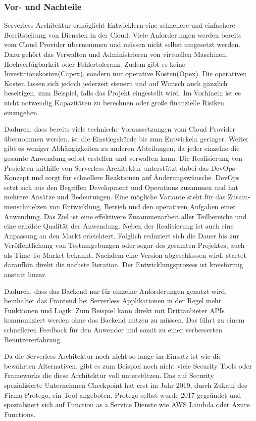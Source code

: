 \subsubsection{Vor- und Nachteile}
Serverless Architektur ermöglicht Entwicklern eine schnellere und einfachere Bereitstellung von Diensten in der Cloud.
Viele Anforderungen werden bereits vom Cloud Provider übernommen und müssen nicht selbst umgesetzt werden.
Dazu gehört das Verwalten und Administrieren von virtuellen Maschinen, Hochverfügbarkeit oder Fehlertoleranz.
Zudem gibt es keine Investitionskosten(Capex), sondern nur operative Kosten(Opex).
Die operativen Kosten lassen sich jedoch jederzeit steuern und auf Wunsch auch gänzlich beseitigen, zum Beispiel, falls das Projekt eingestellt wird.
Im Vorhinein ist es nicht notwendig Kapazitäten zu berechnen oder große finanzielle Risiken einzugehen.

Dadurch, dass bereits viele technische Voraussetzungen vom Cloud Provider übernommen werden, ist die Einstiegshürde bis zum Entwickeln geringer.
Weiter gibt es weniger Abhängigkeiten zu anderen Abteilungen, da jeder einzelne die gesamte Anwendung selbst erstellen und verwalten kann.
Die Realisierung von Projekten mithilfe von Serverless Architektur unterstützt dabei das DevOps-Konzept und sorgt für schnellere Reaktionen auf Änderungswünsche.
DevOps setzt sich aus den Begriffen Development und Operations zusammen und hat mehrere Ansätze und Bedeutungen.
Eine mögliche Variante steht für das Zu­sam­men­schmel­zen von Entwicklung, Betrieb und den operativen Aufgaben einer Anwendung.
Das Ziel ist eine effektivere Zusammenarbeit aller Teilbereiche und eine erhöhte Qualität der Anwendung.
Neben der Realisierung ist auch eine Anpassung an den Markt erleichtert.
Folglich reduziert sich die Dauer bis zur Veröffentlichung von Testumgebungen oder sogar des gesamten Projektes, auch als Time-To-Market bekannt.
Nachdem eine Version abgeschlossen wird, startet daraufhin direkt die nächste Iteration.
Der Entwicklungsprozess ist kreisförmig anstatt linear.
\cite[]{DevOps}

Dadurch, dass das Backend nur für einzelne Anforderungen genutzt wird, beinhaltet das Frontend bei Serverless Applikationen in der Regel mehr Funktionen und Logik.
Zum Beispiel kann direkt mit Drittanbieter APIs kommuniziert werden ohne das Backend nutzen zu müssen.
Das führt zu einem schnelleren Feedback für den Anwender und somit zu einer verbesserten Benutzererfahrung.

Da die Serverless Architektur noch nicht so lange im Einsatz ist wie die bewährten Alternativen, gibt es zum Beispiel noch nicht viele Security Tools oder Frameworks die diese Architektur voll unterstützen.
Das auf Security spezialisierte Unternehmen Checkpoint hat erst im Jahr 2019, durch Zukauf des Firma Protego, ein Tool angeboten.
Protego selbst wurde 2017 gegründet und spezialisiert sich auf Function as a Service Dienste wie AWS Lambda oder Azure Functions. \cite[]{Checkpoint}

